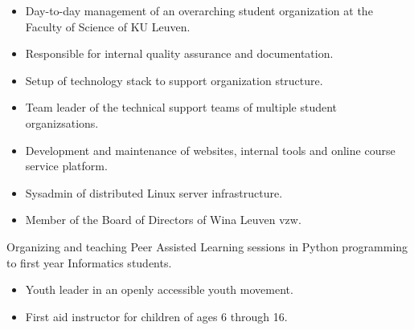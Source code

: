 \documentclass[10pt,a4paper,ragged2e]{altacv}
\begin{document}
\divider


\divider



\begin{itemize}
	\item Day-to-day management of an overarching student organization at the Faculty of Science of KU Leuven.
	\item Responsible for internal quality assurance and documentation.
	\item Setup of technology stack to support organization structure.
\end{itemize}

\divider


\begin{itemize}
	\item Team leader of the technical support teams of multiple student organizsations.
	\item Development and maintenance of websites, internal tools and online course service platform.
	\item Sysadmin of distributed Linux server infrastructure.
	\item Member of the Board of Directors of Wina Leuven vzw.
\end{itemize}

\divider


\small Organizing and teaching Peer Assisted Learning sessions in Python programming to first year Informatics students.

\divider

\begin{itemize}
	\item Youth leader in an openly accessible youth movement.
	\item First aid instructor for children of ages 6 through 16.
\end{itemize}
\end{document}
